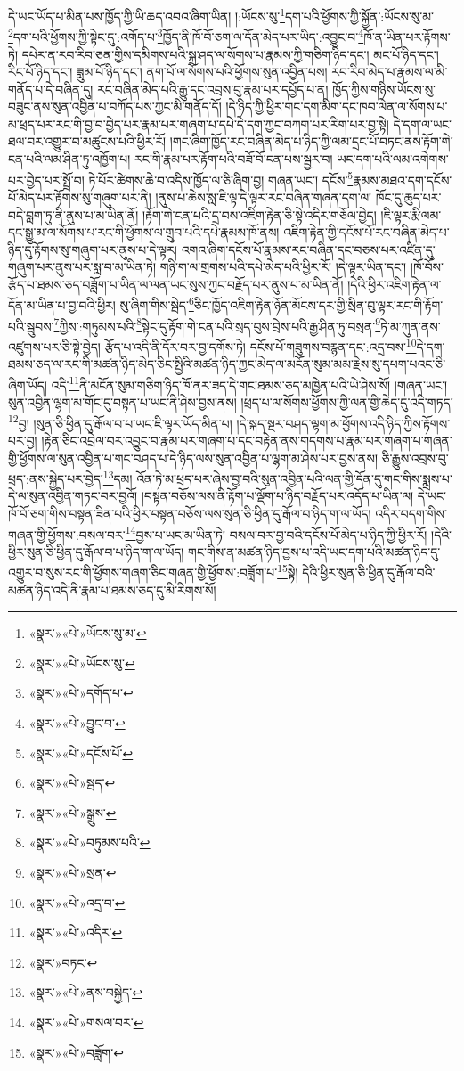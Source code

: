 དེ་ཡང་ཡོད་པ་མིན་པས་ཁྱོད་ཀྱི་ཡི་ཆད་འབའ་ཞིག་ཡིན། །:ཡོངས་སུ་\footnote{«སྣར་»«པེ་»ཡོངས་སུ་མ་}དག་པའི་ཕྱོགས་ཀྱི་སྐྱོན་:ཡོངས་སུ་མ་\footnote{«སྣར་»«པེ་»ཡོངས་སུ་}དག་པའི་ཕྱོགས་ཀྱི་སྟེང་དུ་:འགོད་པ་\footnote{«སྣར་»«པེ་»དགོད་པ་}ཁྱོད་ནི་ཁོ་བོ་ཅག་ལ་དོན་མེད་པར་ཡིད་:འབྱུང་བ་\footnote{«སྣར་»«པེ་»བྱུང་བ་}ཁོ་ན་ཡིན་པར་རྟོགས་ཏེ། དཔེར་ན་རབ་རིབ་ཅན་གྱིས་དམིགས་པའི་སྐྲ་ཤད་ལ་སོགས་པ་རྣམས་ཀྱི་གཅིག་ཉིད་དང་། མང་པོ་ཉིད་དང་། རིང་པོ་ཉིད་དང་། ཟླུམ་པོ་ཉིད་དང་། ནག་པོ་ལ་སོགས་པའི་ཕྱོགས་སུན་འབྱིན་པས། རབ་རིབ་མེད་པ་རྣམས་ལ་མི་གནོད་པ་དེ་བཞིན་དུ། རང་བཞིན་མེད་པའི་རྒྱུ་དང་འབྲས་བུ་རྣམ་པར་དཔྱོད་པ་ན། ཁྱོད་ཀྱིས་གཉིས་ཡོངས་སུ་བཟུང་ནས་སུན་འབྱིན་པ་བཀོད་པས་ཀྱང་མི་གནོད་དོ། །དེ་ཉིད་ཀྱི་ཕྱིར་གང་དག་མིག་དང་ཁབ་ལེན་ལ་སོགས་པ་མ་ཕྲད་པར་རང་གི་བྱ་བ་བྱེད་པར་རྣམ་པར་གཞག་པ་དཔེ་དེ་དག་ཀྱང་བཀག་པར་རིག་པར་བྱ་སྟེ། དེ་དག་ལ་ཡང་ཐལ་བར་འགྱུར་བ་མཚུངས་པའི་ཕྱིར་རོ། །གང་ཞིག་ཁྱོད་རང་བཞིན་མེད་པ་ཉིད་ཀྱི་ལམ་དྲང་པོ་བཏང་ནས་རྟོག་གེ་ངན་པའི་ལམ་ཤིན་ཏུ་འཁྱོག་པ། རང་གི་རྣམ་པར་རྟོག་པའི་བཟོ་བོ་ངན་པས་སྦྱར་བ། ཡང་དག་པའི་ལམ་འགེགས་པར་བྱེད་པར་སྤྲོ་བ། ཏེ་པོར་ཚེགས་ཆེ་བ་འདིས་ཁྱོད་ལ་ཅི་ཞིག་བྱ། གཞན་ཡང་། དངོས་\footnote{«སྣར་»«པེ་»དངོས་པོ་}རྣམས་མཐའ་དག་དངོས་པོ་མེད་པར་རྟོགས་སུ་གཞུག་པར་ནི། །ནུས་པ་ཆེས་སླ་ཇི་ལྟ་དེ་ལྟར་རང་བཞིན་གཞན་དག་ལ། ཁོང་དུ་ཆུད་པར་བདེ་བླག་ཏུ་ནི་ནུས་པ་མ་ཡིན་ནོ། །རྟོག་གེ་ངན་པའི་དྲ་བས་འཇིག་རྟེན་ཅི་སྟེ་འདིར་གཅོལ་བྱེད། །ཇི་ལྟར་རྨི་ལམ་དང་སྒྱུ་མ་ལ་སོགས་པ་རང་གི་ཕྱོགས་ལ་གྲུབ་པའི་དཔེ་རྣམས་ཁོ་ནས། འཇིག་རྟེན་གྱི་དངོས་པོ་རང་བཞིན་མེད་པ་ཉིད་དུ་རྟོགས་སུ་གཞུག་པར་ནུས་པ་དེ་ལྟར། འགའ་ཞིག་དངོས་པོ་རྣམས་རང་བཞིན་དང་བཅས་པར་འཛིན་དུ་གཞུག་པར་ནུས་པར་སླ་བ་མ་ཡིན་ཏེ། གཉི་ག་ལ་གྲགས་པའི་དཔེ་མེད་པའི་ཕྱིར་རོ། །དེ་ལྟར་ཡིན་དང་། །ཁོ་བོས་རྩོད་པ་ཐམས་ཅད་བཟློག་པ་ཡིན་ལ་ལན་ཡང་སུས་ཀྱང་བརྗོད་པར་ནུས་པ་མ་ཡིན་ནོ། །དེའི་ཕྱིར་འཇིག་རྟེན་ལ་དོན་མ་ཡིན་པ་བྱ་བའི་ཕྱིར། སུ་ཞིག་གིས་སྦེད་\footnote{«སྣར་»«པེ་»སྦད་}ཅིང་ཁྱོད་འཇིག་རྟེན་ཉོན་མོངས་དར་གྱི་སྲིན་བུ་ལྟར་རང་གི་རྟོག་པའི་སྦུབས་\footnote{«སྣར་»«པེ་»སྒྲུས་}ཀྱིས་:གཏུམས་པའི་\footnote{«སྣར་»«པེ་»བཏུམས་པའི་}སྟེང་དུ་རྟོག་གེ་ངན་པའི་སྲད་བུས་བྲེས་པའི་རྒྱ་ཤིན་ཏུ་བསྲན་\footnote{«སྣར་»«པེ་»སྲན་}ཏེ་མ་ཀུན་ནས་འཛུགས་པར་ཅི་སྟེ་བྱེད། རྩོད་པ་འདི་ནི་དོར་བར་བྱ་དགོས་ཏེ། དངོས་པོ་གཟུགས་བརྙན་དང་:འདྲ་བས་\footnote{«སྣར་»«པེ་»འདྲ་བ་}དེ་དག་ཐམས་ཅད་ལ་རང་གི་མཚན་ཉིད་མེད་ཅིང་སྤྱིའི་མཚན་ཉིད་ཀྱང་མེད་ལ་མངོན་སུམ་མམ་རྗེས་སུ་དཔག་པའང་ཅི་ཞིག་ཡོད། འདི་\footnote{«སྣར་»«པེ་»འདིར་}ནི་མངོན་སུམ་གཅིག་ཉིད་ཁོ་ནར་ཟད་དེ་གང་ཐམས་ཅད་མཁྱེན་པའི་ཡེ་ཤེས་སོ། །གཞན་ཡང་། སུན་འབྱིན་ལྷག་མ་གོང་དུ་བསྟན་པ་ཡང་ནི་ཤེས་བྱས་ནས། །ཕྲད་པ་ལ་སོགས་ཕྱོགས་ཀྱི་ལན་གྱི་ཆེད་དུ་འདི་གཏད་\footnote{«སྣར་»བཏང་}བྱ། །སུན་ཅི་ཕྱིན་དུ་རྒོལ་བ་པ་ཡང་ཇི་ལྟར་ཡོད་མིན་པ། །དེ་སྐད་སྔར་བཤད་ལྷག་མ་ཕྱོགས་འདི་ཉིད་ཀྱིས་རྟོགས་པར་བྱ། །རྟེན་ཅིང་འབྲེལ་བར་འབྱུང་བ་རྣམ་པར་གཞག་པ་དང་བརྟེན་ནས་གདགས་པ་རྣམ་པར་གཞག་པ་གཞན་གྱི་ཕྱོགས་ལ་སུན་འབྱིན་པ་གང་བཤད་པ་དེ་ཉིད་ལས་སུན་འབྱིན་པ་ལྷག་མ་ཤེས་པར་བྱས་ནས། ཅི་རྒྱུས་འབྲས་བུ་ཕྲད་:ནས་སྐྱེད་པར་བྱེད་\footnote{«སྣར་»«པེ་»ནས་བསྐྱེད་}དམ། འོན་ཏེ་མ་ཕྲད་པར་ཞེས་བྱ་བའི་སུན་འབྱིན་པའི་ལན་གྱི་དོན་དུ་གང་གིས་སྨྲས་པ་དེ་ལ་སུན་འབྱིན་གཏང་བར་བྱའོ། །བསྟན་བཅོས་ལས་ནི་རྟོག་པ་ལྡོག་པ་ཉིད་བརྗོད་པར་འདོད་པ་ཡིན་ལ། དེ་ཡང་ཁོ་བོ་ཅག་གིས་བསྟན་ཟིན་པའི་ཕྱིར་བསྟན་བཅོས་ལས་སུན་ཅི་ཕྱིན་དུ་རྒོལ་བ་ཉིད་ག་ལ་ཡོད། འདིར་བདག་གིས་གཞན་གྱི་ཕྱོགས་:བསལ་བར་\footnote{«སྣར་»«པེ་»གསལ་བར་}བྱས་པ་ཡང་མ་ཡིན་ཏེ། བསལ་བར་བྱ་བའི་དངོས་པོ་མེད་པ་ཉིད་ཀྱི་ཕྱིར་རོ། །དེའི་ཕྱིར་སུན་ཅི་ཕྱིན་དུ་རྒོལ་བ་པ་ཉིད་ག་ལ་ཡོད། གང་གིས་ན་མཚན་ཉིད་བྱས་པ་འདི་ཡང་དག་པའི་མཚན་ཉིད་དུ་འགྱུར་བ་སུས་རང་གི་ཕྱོགས་གཞག་ཅིང་གཞན་གྱི་ཕྱོགས་:བཟློག་པ་\footnote{«སྣར་»«པེ་»བཟློག་}སྟེ། དེའི་ཕྱིར་སུན་ཅི་ཕྱིན་དུ་རྒོལ་བའི་མཚན་ཉིད་འདི་ནི་རྣམ་པ་ཐམས་ཅད་དུ་མི་རིགས་སོ། 